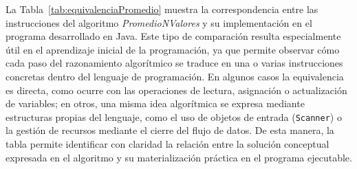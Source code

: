 \documentclass[12pt,twoside]{book}
\begin{document}
					\noindent
					La Tabla~\ref{tab:equivalenciaPromedio} muestra la correspondencia entre las instrucciones del algoritmo \textit{PromedioNValores} y su implementación en el programa desarrollado en Java. Este tipo de comparación resulta especialmente útil en el aprendizaje inicial de la programación, ya que permite observar cómo cada paso del razonamiento algorítmico se traduce en una o varias instrucciones concretas dentro del lenguaje de programación. En algunos casos la equivalencia es directa, como ocurre con las operaciones de lectura, asignación o actualización de variables; en otros, una misma idea algorítmica se expresa mediante estructuras propias del lenguaje, como el uso de objetos de entrada (\texttt{Scanner}) o la gestión de recursos mediante el cierre del flujo de datos. De esta manera, la tabla permite identificar con claridad la relación entre la solución conceptual expresada en el algoritmo y su materialización práctica en el programa ejecutable.
					
\end{document}
